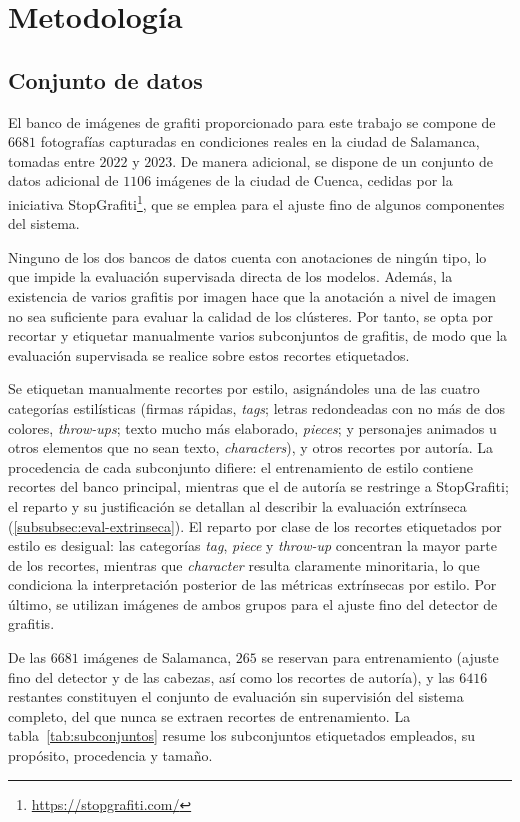 \section{Metodología}
\label{sec:metodologia}

\subsection{Conjunto de datos}
\label{subsec:dataset}
El banco de imágenes de grafiti proporcionado para este trabajo se compone de
$6681$ fotografías capturadas en condiciones reales en la ciudad de Salamanca,
tomadas entre $2022$ y $2023$. De manera adicional, se dispone de un conjunto
de datos adicional de $1106$ imágenes de la ciudad de Cuenca, cedidas por la
iniciativa StopGrafiti\footnote{\url{https://stopgrafiti.com/}}, que se emplea
para el ajuste fino de algunos componentes del sistema.

Ninguno de los dos bancos de datos cuenta con anotaciones de ningún tipo, lo
que impide la evaluación supervisada directa de los modelos. Además, la
existencia de varios grafitis por imagen hace que la anotación a nivel de
imagen no sea suficiente para evaluar la calidad de los clústeres. Por tanto,
se opta por recortar y etiquetar manualmente varios subconjuntos de grafitis,
de modo que la evaluación supervisada se realice sobre estos recortes
etiquetados.

Se etiquetan manualmente recortes por estilo, asignándoles una de las cuatro
categorías estilísticas (firmas rápidas, \textit{tags}; letras redondeadas con
no más de dos colores, \textit{throw-ups}; texto mucho más elaborado,
\textit{pieces}; y personajes animados u otros elementos que no sean texto,
\textit{characters}), y otros recortes por autoría. La procedencia de cada
subconjunto difiere: el entrenamiento de estilo contiene recortes del banco
principal, mientras que el de autoría se restringe a StopGrafiti; el reparto y
su justificación se detallan al describir la evaluación extrínseca
(\ref{subsubsec:eval-extrinseca}). El reparto por clase de los recortes
etiquetados por estilo es desigual: las categorías \textit{tag}, \textit{piece}
y \textit{throw-up} concentran la mayor parte de los recortes, mientras que
\textit{character} resulta claramente minoritaria, lo que condiciona la
interpretación posterior de las métricas extrínsecas por estilo. Por último, se
utilizan imágenes de ambos grupos para el ajuste fino del detector de grafitis.

De las $6681$ imágenes de Salamanca, $265$ se reservan para entrenamiento
(ajuste fino del detector y de las cabezas, así como los recortes de autoría),
y las $6416$ restantes constituyen el conjunto de evaluación sin supervisión
del sistema completo, del que nunca se extraen recortes de entrenamiento. La
tabla~\ref{tab:subconjuntos} resume los subconjuntos etiquetados empleados, su
propósito, procedencia y tamaño.

